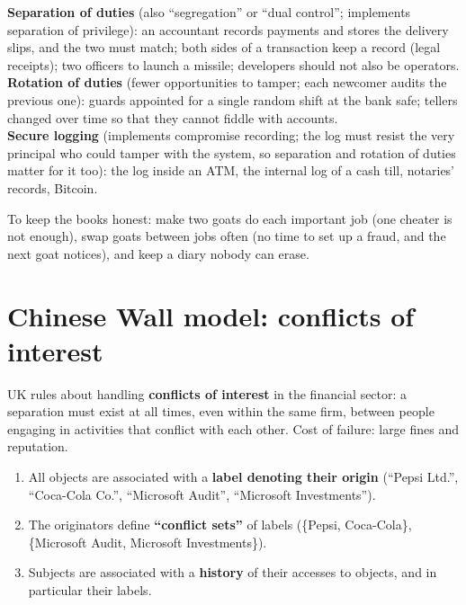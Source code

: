 \begin{exbox}[title=Examples of the three principles]
\textbf{Separation of duties} (also ``segregation'' or ``dual control''; implements separation of
privilege): an accountant records payments and stores the delivery slips, and the two must match;
both sides of a transaction keep a record (legal receipts); two officers to launch a missile;
developers should not also be operators. \\
\textbf{Rotation of duties} (fewer opportunities to tamper; each newcomer audits the previous
one): guards appointed for a single random shift at the bank safe; tellers changed over time so
that they cannot fiddle with accounts. \\
\textbf{Secure logging} (implements compromise recording; the log must resist the very principal
who could tamper with the system, so separation and rotation of duties matter for it too): the log
inside an ATM, the internal log of a cash till, notaries' records, Bitcoin.
\end{exbox}

\begin{goatbox}
To keep the books honest: make two goats do each important job (one cheater is not enough), swap
goats between jobs often (no time to set up a fraud, and the next goat notices), and keep a diary
nobody can erase.
\end{goatbox}

\section{Chinese Wall model: conflicts of interest}

\begin{rembox}[title=Inspiration]
UK rules about handling \textbf{conflicts of interest} in the financial sector: a
separation must exist at all times, even within the same firm, between people engaging
in activities that conflict with each other. Cost of failure: large fines and
reputation.
\end{rembox}

\begin{defnbox}[title=Chinese Wall model --- entities]
\begin{enumerate}
  \item All objects are associated with a \textbf{label denoting their origin}
        (``Pepsi Ltd.'', ``Coca-Cola Co.'', ``Microsoft Audit'', ``Microsoft
        Investments'').
  \item The originators define \textbf{``conflict sets''} of labels
        (\{Pepsi, Coca-Cola\}, \{Microsoft Audit, Microsoft Investments\}).
  \item Subjects are associated with a \textbf{history} of their accesses to objects,
        and in particular their labels.
\end{enumerate}
\end{defnbox}

